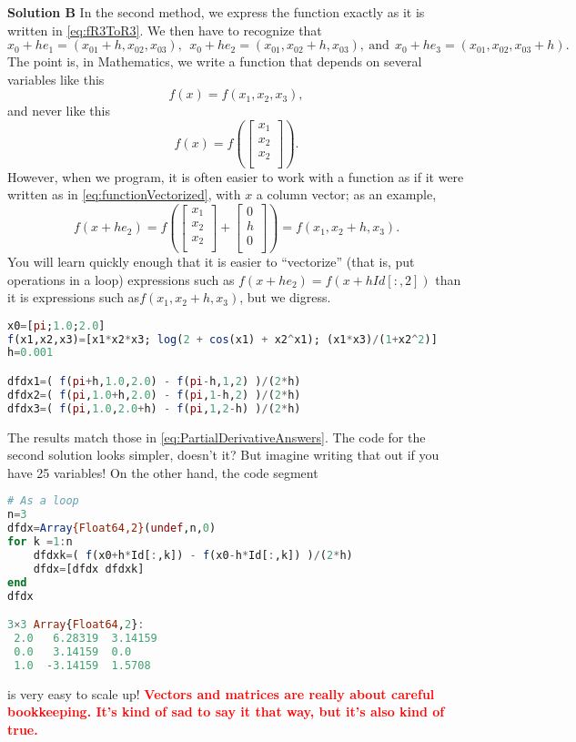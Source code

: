 \textbf{Solution B} In the second method, we express the function exactly as it is written in \eqref{eq:fR3ToR3}. We then have to recognize that
$$x_0 + h e_1 = (x_{01} +h, x_{02}, x_{03}),~ ~x_0 + h e_2 = (x_{01}, x_{02}+h, x_{03}),~ \text{and}~~ x_0 + h e_3 = (x_{01}, x_{02}, x_{03}+h).$$
The point is, in Mathematics,  we write a function that depends on several variables like this
$$f(x) = f(x_1, x_2, x_3) , $$
and never like this
\begin{equation}
    \label{eq:functionVectorized}
    f(x) = f(\left[
\begin{array}{c}
x_1 \\
x_2 \\
x_2 \\
\end{array}
\right] ).
\end{equation} 
However, when we program, it is often easier to work with a function as if it were written as in \eqref{eq:functionVectorized}, with $x$ a column vector; as an example,
$$f(x + h e_2) =   f(\left[
\begin{array}{c}
x_1 \\
x_2 \\
x_2 \\
\end{array}
\right] +\left[
\begin{array}{c}
0 \\
h \\
0 \\
\end{array}
\right] ) = f(x_1, x_2 + h, x_3). $$
You will learn quickly enough that it is easier to ``vectorize'' (that is, put operations in a loop) expressions such as $f(x + h e_2) = f(x + h Id[:, 2])$ than it is expressions such as$ f(x_1, x_2 + h, x_3)$, but we digress. 

\vspace*{0.2cm}

 \begin{lstlisting}[language=Julia,style=mystyle]
x0=[pi;1.0;2.0]
f(x1,x2,x3)=[x1*x2*x3; log(2 + cos(x1) + x2^x1); (x1*x3)/(1+x2^2)]
h=0.001

dfdx1=( f(pi+h,1.0,2.0) - f(pi-h,1,2) )/(2*h)  
dfdx2=( f(pi,1.0+h,2.0) - f(pi,1-h,2) )/(2*h)  
dfdx3=( f(pi,1.0,2.0+h) - f(pi,1,2-h) )/(2*h)
 \end{lstlisting}
 
The results match those in \eqref{eq:PartialDerivativeAnswers}. The code for the second solution looks simpler, doesn't it? But imagine writing that out if you have 25 variables! On the other hand, the code segment
\begin{lstlisting}[language=Julia,style=mystyle]
# As a loop
n=3
dfdx=Array{Float64,2}(undef,n,0)
for k =1:n
    dfdxk=( f(x0+h*Id[:,k]) - f(x0-h*Id[:,k]) )/(2*h)
    dfdx=[dfdx dfdxk]    
end
dfdx

3×3 Array{Float64,2}:
 2.0   6.28319  3.14159
 0.0   3.14159  0.0
 1.0  -3.14159  1.5708
\end{lstlisting}
is very easy to scale up! \textcolor{red}{\bf Vectors and matrices are really about careful bookkeeping. It's kind of sad to say it that way, but it's also kind of true.}
 \Qed
 
